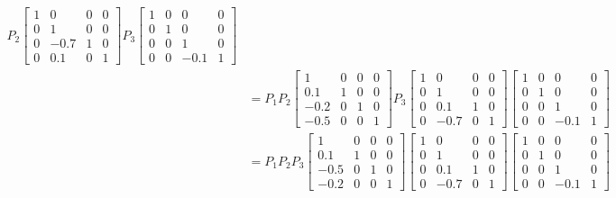\begin{example}
\begin{align*}
P_2
\left[ \begin{array}{cccc} 1 & 0 & 0 & 0 \\ 0 & 1 & 0 & 0 \\ 0 & -0.7 & 1 & 0 \\ 0 & 0.1 & 0 & 1 \end{array} \right]
P_3
\left[ \begin{array}{cccc} 1 & 0 & 0 & 0 \\ 0 & 1 & 0 & 0 \\ 0 & 0 & 1 & 0 \\ 0 & 0 & -0.1 & 1 \end{array} \right] \\
&=
P_1 P_2
\left[ \begin{array}{cccc} 1 & 0 & 0 & 0 \\ 0.1 & 1 & 0 & 0 \\ -0.2 & 0 & 1 & 0 \\ -0.5 & 0 & 0 & 1 \end{array} \right]
P_3
\left[ \begin{array}{cccc} 1 & 0 & 0 & 0 \\ 0 & 1 & 0 & 0 \\ 0 & 0.1 & 1 & 0 \\ 0 & -0.7 & 0 & 1 \end{array} \right]
\left[ \begin{array}{cccc} 1 & 0 & 0 & 0 \\ 0 & 1 & 0 & 0 \\ 0 & 0 & 1 & 0 \\ 0 & 0 & -0.1 & 1 \end{array} \right] \\
&=
P_1 P_2 P_3
\left[ \begin{array}{cccc} 1 & 0 & 0 & 0 \\ 0.1 & 1 & 0 & 0 \\ -0.5 & 0 & 1 & 0 \\ -0.2 & 0 & 0 & 1 \end{array} \right]
\left[ \begin{array}{cccc} 1 & 0 & 0 & 0 \\ 0 & 1 & 0 & 0 \\ 0 & 0.1 & 1 & 0 \\ 0 & -0.7 & 0 & 1 \end{array} \right]
\left[ \begin{array}{cccc} 1 & 0 & 0 & 0 \\ 0 & 1 & 0 & 0 \\ 0 & 0 & 1 & 0 \\ 0 & 0 & -0.1 & 1 \end{array} \right] \\

\end{align*}
\end{example}
